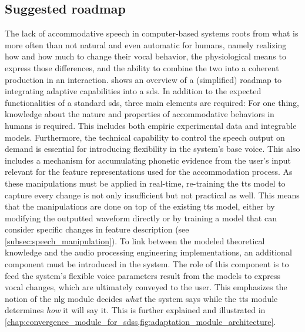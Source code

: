 \subsection{Suggested roadmap}
\label{subsec:suggested roadmap}

The lack of accommodative speech in computer-based systems roots from what is more often than not natural and even automatic for humans, namely realizing how and how much to change their vocal behavior, the physiological means to express those differences, and the ability to combine the two into a coherent production in an interaction.
 shows an overview of a (simplified) roadmap to integrating adaptive capabilities into a \ac{sds}.
In addition to the expected functionalities of a standard \ac{sds}, three main elements are required:
For one thing, knowledge about the nature and properties of accommodative behaviors in humans is required.
This includes both empiric experimental data and integrable models.
Furthermore, the technical capability to control the speech output on demand is essential for introducing flexibility in the system's base voice.
This also includes a mechanism for accumulating phonetic evidence from the user's input relevant for the feature representations used for the accommodation process.
As these manipulations must be applied in real-time, re-training the \ac{tts} model to capture every change is not only insufficient but not practical as well.
This means that the manipulations are done on top of the existing \ac{tts} model, either by modifying the outputted waveform directly or by training a model that can consider specific changes in feature description (see \cref{subsec:speech_manipulation}).
To link between the modeled theoretical knowledge and the audio processing engineering implementations, an additional component must be introduced in the system.
The role of this component is to feed the system's flexible voice parameters result from the models to express vocal changes, which are ultimately conveyed to the user.
This emphasizes the notion of the \ac{nlg} module decides \emph{what} the system says while the \ac{tts} module determines \emph{how} it will say it.
This is further explained and illustrated in \cref{chap:convergence_module_for_sdss,fig:adaptation_module_architecture}.

